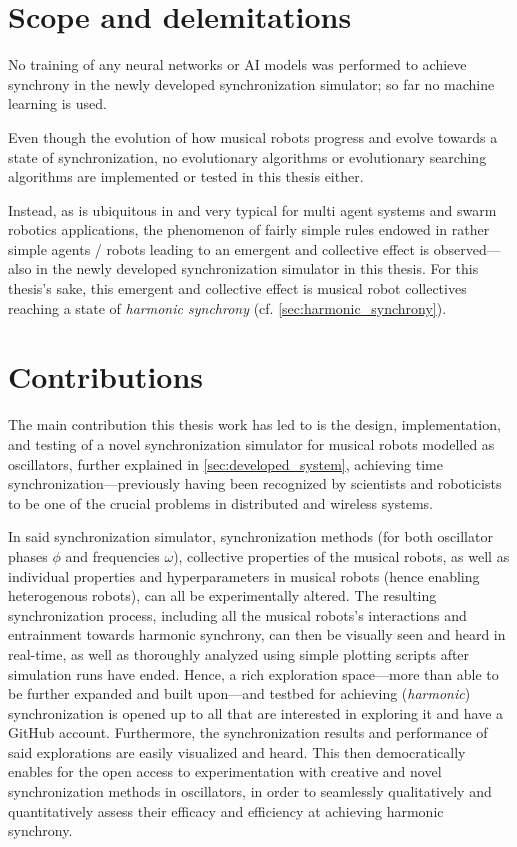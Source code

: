 


\section{Scope and delemitations}

No training of any neural networks or AI models was performed to achieve synchrony in the newly developed synchronization simulator; so far no machine learning is used.

Even though the evolution of how musical robots progress and evolve towards a state of synchronization, no evolutionary algorithms or evolutionary searching algorithms are implemented or tested in this thesis either.

Instead, as is ubiquitous in and very typical for multi agent systems and swarm robotics applications, the phenomenon of fairly simple rules endowed in rather simple agents / robots leading to an emergent and collective effect is observed—also in the newly developed synchronization simulator in this thesis. For this thesis's sake, this emergent and collective effect is musical robot collectives reaching a state of \textit{harmonic synchrony} (cf. \ref{sec:harmonic_synchrony}).


\section{Contributions}

The main contribution this thesis work has led to is the design, implementation, and testing of a novel synchronization simulator for musical robots modelled as oscillators, further explained in \ref{sec:developed_system}, achieving time synchronization—previously having been recognized by scientists and roboticists to be one of the crucial problems in distributed and wireless systems.

In said synchronization simulator, synchronization methods (for both oscillator phases $\phi$ and frequencies $\omega$), collective properties of the musical robots, as well as individual properties and hyperparameters in musical robots (hence enabling heterogenous robots), can all be experimentally altered. The resulting synchronization process, including all the musical robots's interactions and entrainment towards harmonic synchrony, can then be visually seen and heard in real-time, as well as thoroughly analyzed using simple plotting scripts after simulation runs have ended. Hence, a rich exploration space—more than able to be further expanded and built upon—and testbed for achieving (\textit{harmonic}) synchronization is opened up to all that are interested in exploring it and have a GitHub account. Furthermore, the synchronization results and performance of said explorations are easily visualized and heard. This then democratically enables for the open access to experimentation with creative and novel synchronization methods in oscillators, in order to seamlessly qualitatively and quantitatively assess their efficacy and efficiency at achieving harmonic synchrony.

